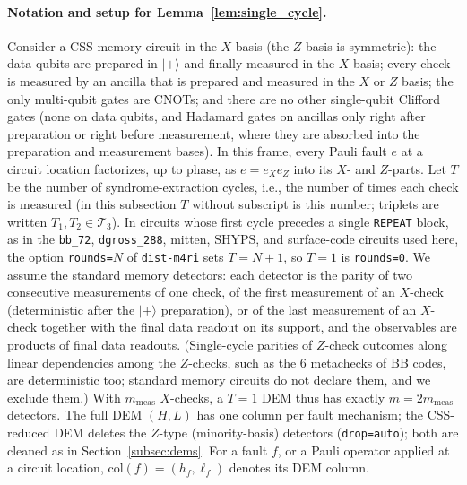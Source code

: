 \documentclass[12pt]{article}
\theoremstyle{definition}
\newcommand{\Tc}{\mathcal{T}_3}
\newcommand{\ttt}[1]{\texttt{#1}}
\begin{document}
\paragraph{Notation and setup for Lemma~\ref{lem:single_cycle}.}
Consider a CSS memory circuit in the $X$ basis (the $Z$ basis is symmetric): the data qubits are prepared in
$|+\rangle$ and finally measured in the $X$ basis; every check is measured by an ancilla that is prepared and measured
in the $X$ or $Z$ basis; the only multi-qubit gates are CNOTs; and there are no other single-qubit Clifford gates
(none on data qubits, and Hadamard gates on ancillas only right after preparation or right before measurement, where
they are absorbed into the preparation and measurement bases). In this frame, every Pauli fault $e$ at a circuit
location factorizes, up to phase, as $e = e_X e_Z$ into its $X$- and $Z$-parts. Let $T$ be the number of
syndrome-extraction cycles, i.e., the number of times each check is measured (in this subsection $T$ without subscript
is this number; triplets are written $T_1, T_2 \in \Tc$). In circuits whose first cycle precedes a single
\ttt{REPEAT} block, as in the \ttt{bb\_72}, \ttt{dgross\_288}, mitten, SHYPS, and surface-code circuits used here, the
option \ttt{rounds=}$N$ of \ttt{dist-m4ri} sets $T = N + 1$, so $T = 1$ is \ttt{rounds=0}. We assume the standard
memory detectors: each detector is the parity of two consecutive measurements of one check, of the first measurement
of an $X$-check (deterministic after the $|+\rangle$ preparation), or of the last measurement of an $X$-check together
with the final data readout on its support, and the observables are products of final data readouts. (Single-cycle
parities of $Z$-check outcomes along linear dependencies among the $Z$-checks, such as the $6$ metachecks of BB codes,
are deterministic too; standard memory circuits do not declare them, and we exclude them.) With $m_{\mathrm{meas}}$
$X$-checks, a $T = 1$ DEM thus has exactly $m = 2 m_{\mathrm{meas}}$ detectors. The full DEM $(H, L)$ has one column
per fault mechanism; the CSS-reduced DEM deletes the $Z$-type (minority-basis) detectors (\ttt{drop=auto}); both are
cleaned as in Section~\ref{subsec:dems}. For a fault $f$, or a Pauli operator applied at a circuit location,
$\mathrm{col}(f) = (h_f, \ell_f)$ denotes its DEM column.
\end{document}
